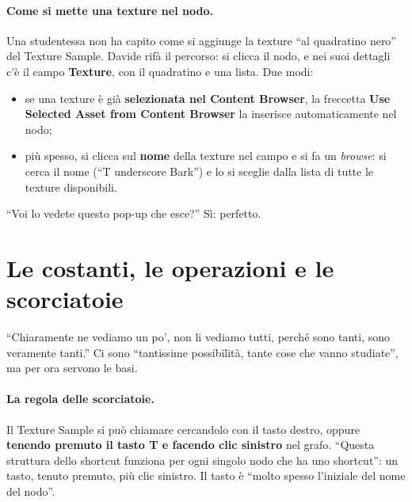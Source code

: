\paragraph{Come si mette una texture nel nodo.} Una studentessa non ha capito come si
aggiunge la texture ``al quadratino nero'' del Texture Sample. Davide rifà il
percorso: si clicca il nodo, e nei suoi dettagli c'è il campo \textbf{Texture}, con il
quadratino e una lista. Due modi:
\begin{itemize}
  \item se una texture è già \textbf{selezionata nel Content Browser}, la freccetta
        \textbf{Use Selected Asset from Content Browser} la inserisce automaticamente
        nel nodo;
  \item più spesso, si clicca sul \textbf{nome} della texture nel campo e si fa un
        \emph{browse}: si cerca il nome (``T underscore Bark'') e lo si sceglie dalla
        lista di tutte le texture disponibili.
\end{itemize}
``Voi lo vedete questo pop-up che esce?'' Sì: perfetto.

\section{Le costanti, le operazioni e le scorciatoie}
\label{ue3:sec:costanti}

``Chiaramente ne vediamo un po', non li vediamo tutti, perché sono tanti, sono
veramente tanti.'' Ci sono ``tantissime possibilità, tante cose che vanno studiate'',
ma per ora servono le basi.

\paragraph{La regola delle scorciatoie.} Il Texture Sample si può chiamare cercandolo
con il tasto destro, oppure \textbf{tenendo premuto il tasto T e facendo clic
sinistro} nel grafo. ``Questa struttura dello shortcut funziona per ogni singolo nodo
che ha uno shortcut'': un tasto, tenuto premuto, più clic sinistro. Il tasto è
``molto spesso l'iniziale del nome del nodo''.

